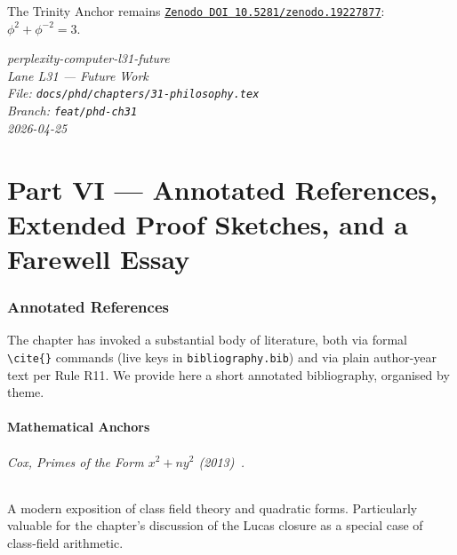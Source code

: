 The Trinity Anchor remains \href{https://zenodo.org/records/19227877}{\texttt{Zenodo DOI 10.5281/zenodo.19227877}}: $\phi^{2} + \phi^{-2} = 3$.

\begin{flushright}
\emph{perplexity-computer-l31-future}\\
\emph{Lane L31 — Future Work}\\
\emph{File: \texttt{docs/phd/chapters/31-philosophy.tex}}\\
\emph{Branch: \texttt{feat/phd-ch31}}\\
\emph{2026-04-25}\\
\end{flushright}


\part*{Part VI — Annotated References, Extended Proof Sketches, and a Farewell Essay}

\section{Annotated References}
\label{sec:31-annotated-refs}

The chapter has invoked a substantial body of literature, both via formal \texttt{\textbackslash cite\{\}} commands (live keys in \texttt{bibliography.bib}) and via plain author-year text per Rule R11. We provide here a short annotated bibliography, organised by theme.

\subsection{Mathematical Anchors}
\label{sec:31-refs-math-anchors}

\paragraph{Cox, \emph{Primes of the Form $x^{2} + n y^{2}$} (2013)~\cite{cox_golden_ratio}.} A modern exposition of class field theory and quadratic forms. Particularly valuable for the chapter's discussion of the Lucas closure as a special case of class-field arithmetic.

